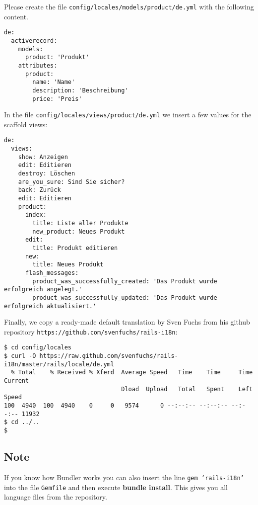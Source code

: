 \documentclass[a4paper]{book}
\begin{document}
Please create the file \texttt{config/locales/models/product/de.yml} with the following content.

\begin{shaded}\begin{verbatim}
de:
  activerecord:
    models:
      product: 'Produkt'
    attributes:
      product:
        name: 'Name'
        description: 'Beschreibung'
        price: 'Preis'
\end{verbatim}\end{shaded}

In the file \texttt{config/locales/views/product/de.yml} we insert a few values for the scaffold views:

\begin{shaded}\begin{verbatim}
de:
  views:
    show: Anzeigen
    edit: Editieren
    destroy: Löschen
    are_you_sure: Sind Sie sicher?
    back: Zurück
    edit: Editieren
    product:
      index:
        title: Liste aller Produkte
        new_product: Neues Produkt
      edit:
        title: Produkt editieren
      new:
        title: Neues Produkt
      flash_messages:
        product_was_successfully_created: 'Das Produkt wurde erfolgreich angelegt.'
        product_was_successfully_updated: 'Das Produkt wurde erfolgreich aktualisiert.'
\end{verbatim}\end{shaded}

Finally, we copy a ready-made default translation by Sven Fuchs from his github repository \texttt{https://github.com/svenfuchs/rails-i18n}:

\begin{shaded}\begin{verbatim}
$ cd config/locales
$ curl -O https://raw.github.com/svenfuchs/rails-i18n/master/rails/locale/de.yml
  % Total    % Received % Xferd  Average Speed   Time    Time     Time  Current
                                 Dload  Upload   Total   Spent    Left  Speed
100  4940  100  4940    0     0   9574      0 --:--:-- --:--:-- --:--:-- 11932
$ cd ../..
$
\end{verbatim}\end{shaded}

\subsection{Note}\label{note-49}

If you know how Bundler works you can also insert the line \texttt{gem 'rails-i18n'} into the file \texttt{Gemfile} and then execute \textbf{bundle install}. This gives you all language files from the repository.
\end{document}
